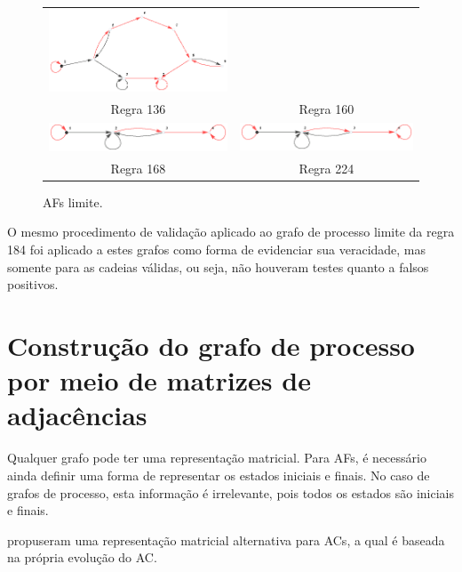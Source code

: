 \documentclass[12pt,a4paper]{article}
\begin{document}
\begin{figure}[H]
\begin{tabular}{c c}
\includegraphics[scale=0.7]{img/limit160} \\
Regra 136 & Regra 160 \\
\includegraphics[scale=0.7]{img/limit168} &
\includegraphics[scale=0.7]{img/limit224} \\
Regra 168 & Regra 224 \\
\end{tabular}
\caption{AFs limite.}
\label{fig:limits}
\end{figure}

O mesmo procedimento de validação aplicado ao grafo de processo limite da
regra 184 foi aplicado a estes grafos como forma de evidenciar sua
veracidade, mas somente para as cadeias válidas, ou seja, não houveram testes
quanto a falsos positivos.

\newpage

\section{Construção do grafo de processo por meio de matrizes de
adjacências}\label{sec:matrix}

Qualquer grafo pode ter uma representação matricial. Para AFs, é necessário
ainda definir uma forma de representar os estados iniciais e finais. No
caso de grafos de processo, esta informação é irrelevante, pois todos
os estados são iniciais e finais.

 propuseram uma representação matricial alternativa para
ACs, a qual é baseada na própria evolução do AC.
\end{document}
